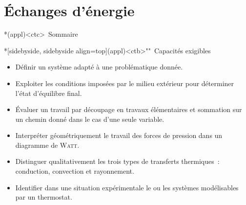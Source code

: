 \documentclass[../../main/main.tex]{subfiles}
\begin{document}
\setcounter{chapter}{1}


\chapter{Échanges d'énergie}

\vspace*{\fill}

\begin{tcn}*(appl)<ctc>{\iconsomm~Sommaire}
	\vspace{-15pt}
	\minitoc
	\vspace{-25pt}
\end{tcn}

\begin{tcn}*[sidebyside, sidebyside align=top](appl)<ctb>""{\iconhow~Capacités exigibles}
	\begin{itemize}[label=\rcheck]
		\item Définir un système adapté à une problématique donnée.

		\item Exploiter les conditions imposées par le milieu extérieur pour
		      déterminer l'état d'équilibre final.

		\item Évaluer un travail par découpage en travaux élémentaires et sommation
		      sur un chemin donné dans le cas d'une seule variable.
	\end{itemize}
	\tcblower
	\begin{itemize}[label=\rcheck]
		\item Interpréter géométriquement le travail des forces de pression dans un
		      diagramme de \textsc{Watt}.

		\item Distinguer qualitativement les trois types de transferts thermiques~:
		      conduction, convection et rayonnement.

		\item Identifier dans une situation expérimentale le ou les systèmes
		      modélisables par un thermostat.
	\end{itemize}
\end{tcn}

\vspace*{\fill}

\newpage
\end{document}
